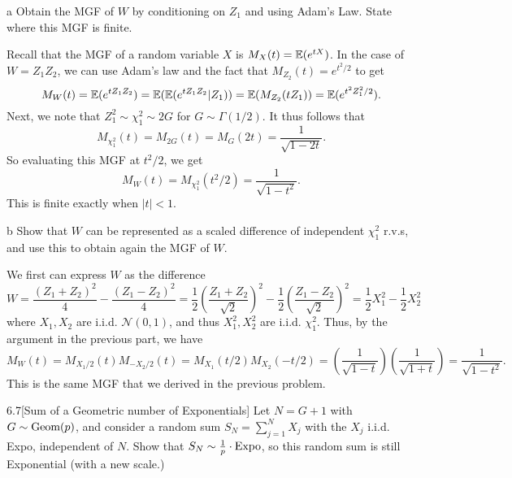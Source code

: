 \documentclass{pset}
\begin{document}
\begin{parts}
  \begin{part}{a}
    Obtain the MGF of $W$ by conditioning on $Z_1$ and using Adam's Law. State where this MGF is finite.
  \end{part}

  Recall that the MGF of a random variable $X$ is $M_X(t) = \mathbb{E}(e^{tX})$. In the case of $W=Z_1Z_2$, we can use Adam's law and the fact that $M_{Z_2}(t)=e^{t^2/2}$ to get
  \[
    M_W(t) = \mathbb{E}(e^{tZ_1Z_2}) = \mathbb{E}(\mathbb{E}(e^{tZ_1Z_2}|Z_1)) = \mathbb{E}(M_{Z_2}(tZ_1)) = \mathbb{E}(e^{t^2Z_1^2/2}).
  \]
  Next, we note that $Z_1^2\sim \chi^2_1 \sim 2G$ for $G\sim \Gamma(1/2)$. It thus follows that \[M_{\chi^2_1}(t) = M_{2G}(t)=M_G(2t)=\frac{1}{\sqrt{1-2t}}.\]
  So evaluating this MGF at $t^2/2$, we get 
  \[M_W(t) = M_{\chi^2_1}(t^2/2) = \frac{1}{\sqrt{1-t^2}}.\]
  This is finite exactly when $|t|<1$.

  \begin{part}{b}
    Show that $W$ can be represented as a scaled difference of independent $\chi_1^2$ r.v.s, and use this to obtain again the MGF of $W$.
  \end{part}

  We first can express $W$ as the difference 
  \[
    W = \frac{(Z_1 + Z_2)^2}{4} - \frac{(Z_1 - Z_2)^2}{4} = \frac{1}{2}\left(\frac{Z_1+Z_2}{\sqrt{2}}\right)^2 - \frac{1}{2}\left(\frac{Z_1 - Z_2}{\sqrt{2}}\right)^2 = \frac{1}{2}X_1^2 - \frac{1}{2}X_2^2
  \]
  where $X_1, X_2$ are i.i.d. $\mathcal{N}(0,1)$, and thus $X_1^2, X_2^2$ are i.i.d. $\chi_1^2$. Thus, by the argument in the previous part, we have
  \[
    M_W(t) = M_{X_1/2}(t)M_{-X_2/2}(t) = M_{X_1}(t/2)M_{X_2}(-t/2) = \left(\frac{1}{\sqrt{1-t}}\right)\left(\frac{1}{\sqrt{1+t}}\right) = \frac{1}{\sqrt{1-t^2}}.
  \]
  This is the same MGF that we derived in the previous problem.
\end{parts}

\begin{problem}{6.7}[Sum of a Geometric number of Exponentials]
  Let $N = G+1$ with $G\sim \textrm{Geom}(p)$, and consider a random sum $S_N = \sum^N_{j=1} X_j$ with the $X_j$ i.i.d. Expo, independent of $N$. Show that $S_N\sim \frac{1}{p}\cdot \textrm{Expo}$, so this random sum is still Exponential (with a new scale.)
\end{problem}
\end{document}
